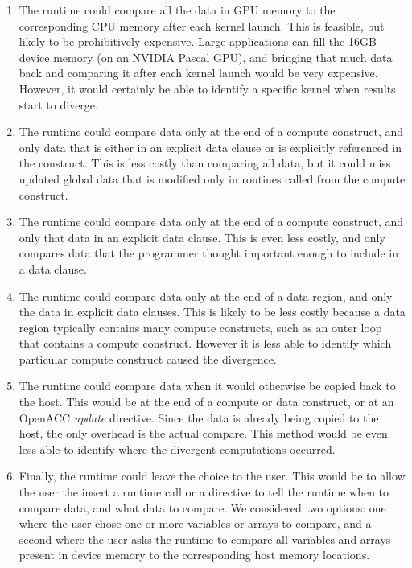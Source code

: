\begin{enumerate}
\item The runtime could compare all the data in GPU memory to the corresponding CPU memory after each kernel launch.
This is feasible, but likely to be prohibitively expensive.
Large applications can fill the 16GB device memory (on an NVIDIA Pascal GPU), and bringing that much data back and comparing it after each kernel launch would be very expensive.
However, it would certainly be able to identify a specific kernel when results start to diverge.

\item The runtime could compare data only at the end of a compute construct, and only data that is either in an explicit data clause or is explicitly referenced in the construct.
This is less costly than comparing all data, but it could miss updated global data that is modified only in routines called from the compute construct.

\item The runtime could compare data only at the end of a compute construct, and only that data in an explicit data clause.
This is even less costly, and only compares data that the programmer thought important enough to include in a data clause.

\item The runtime could compare data only at the end of a data region, and only the data in explicit data clauses.
This is likely to be less costly because a data region typically contains many compute constructs, such as an outer loop that contains a compute construct.
However it is less able to identify which particular compute construct caused the divergence.

\item The runtime could compare data when it would otherwise be copied back to the host.
This would be at the end of a compute or data construct, or at an OpenACC \emph{update} directive.
Since the data is already being copied to the host, the only overhead is the actual compare.
This method would be even less able to identify where the divergent computations occurred.

\item Finally, the runtime could leave the choice to the user.
This would be to allow the user the insert a runtime call or a directive to tell the runtime when to compare data, and what data to compare.
We considered two options: one where the user chose one or more variables or arrays to compare, and a second where the user asks the runtime to compare all variables and arrays present in device memory to the corresponding host memory locations.
\end{enumerate}

